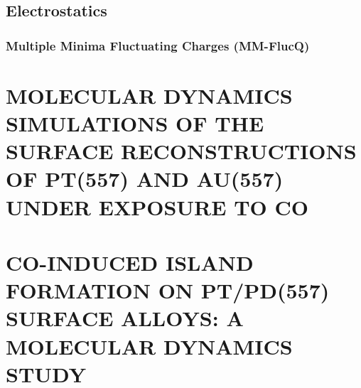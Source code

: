 \documentclass[draft]{nddiss2e}
\begin{document}
\section{Electrostatics}

\subsection{Multiple Minima Fluctuating Charges (MM-FlucQ)}

\chapter{MOLECULAR DYNAMICS SIMULATIONS OF THE SURFACE RECONSTRUCTIONS OF PT(557) AND AU(557) UNDER EXPOSURE TO CO}


\chapter{CO-INDUCED ISLAND FORMATION ON PT/PD(557) SURFACE ALLOYS: A MOLECULAR DYNAMICS STUDY}


\appendix


\backmatter              %



\end{document}
